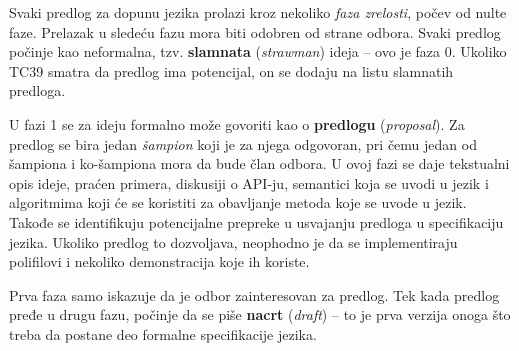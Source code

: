 Svaki predlog za dopunu jezika prolazi kroz nekoliko \textit{faza zrelosti}, počev od nulte faze.
Prelazak u sledeću fazu mora biti odobren od strane odbora.
Svaki predlog počinje kao neformalna, tzv. \textbf{slamnata} (\textsl{strawman}) ideja -- ovo je faza 0.
Ukoliko TC39 smatra da predlog ima potencijal, on se dodaju na listu slamnatih predloga.

U fazi 1 se za ideju formalno može govoriti kao o \textbf{predlogu} (\textsl{proposal}). 
Za predlog se bira jedan \textit{šampion} koji je za njega odgovoran, pri čemu jedan od šampiona i ko-šampiona mora da bude član odbora.
U ovoj fazi se daje tekstualni opis ideje, praćen primera, diskusiji o API-ju, semantici koja se uvodi u jezik i algoritmima koji će se koristiti za obavljanje metoda koje se uvode u jezik.
Takođe se identifikuju potencijalne prepreke u usvajanju predloga u specifikaciju jezika.
Ukoliko predlog to dozvoljava, neophodno je da se implementiraju polifilovi i nekoliko demonstracija koje ih koriste.

Prva faza samo iskazuje da je odbor zainteresovan za predlog.
Tek kada predlog pređe u drugu fazu, počinje da se piše \textbf{nacrt} (\textsl{draft}) -- to je prva verzija onoga što treba da postane deo formalne specifikacije jezika.
